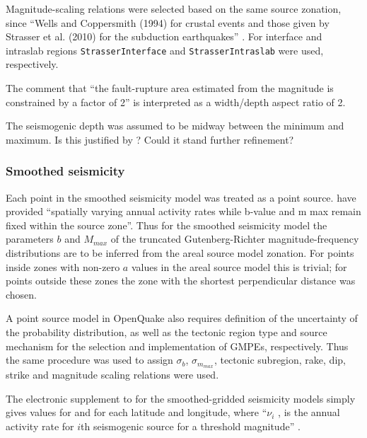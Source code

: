 \documentclass{article}
\begin{document}
Magnitude-scaling relations were selected based on the same source zonation, since ``Wells and Coppersmith (1994) for crustal events and those given by
Strasser et al. (2010) for the subduction earthquakes'' \citep[p.~140]{nath2012probabilistic}. For interface and intraslab regions \texttt{StrasserInterface} and \texttt{StrasserIntraslab} were used, respectively. 

The comment that ``the fault-rupture area estimated from the magnitude is constrained by a factor of 2'' \citep[p.~140]{nath2012probabilistic} is interpreted as a width/depth aspect ratio of 2.

The seismogenic depth was assumed to be midway between the minimum and maximum. Is this justified by \cite{thingbaijam2011seismogenic}? Could it stand further refinement?


\subsubsection{Smoothed seismicity}
\label{sec:Smoothed}

Each point in the smoothed seismicity model was treated as a point source. \cite{nath2012probabilistic} have provided ``spatially varying annual activity rates while b-value and m max remain fixed within the source zone''. Thus for the smoothed seismicity model the parameters $b$ and $M_{max}$ of the truncated Gutenberg-Richter magnitude-frequency distributions are to be inferred from the areal source model zonation. For points inside zones with non-zero $a$ values in the areal source model this is trivial; for points outside these zones the zone with the shortest perpendicular distance was chosen.

A point source model in OpenQuake also requires definition of the uncertainty of the probability distribution, as well as the tectonic region type and source mechanism for the selection and implementation of GMPEs, respectively. Thus the same procedure was used to assign $\sigma_b$, $\sigma_{m_{max}}$, tectonic subregion, rake, dip, strike and magnitude scaling relations were used.

The electronic supplement to \cite{nath2012probabilistic} for the smoothed-gridded seismicity models simply gives values for \texttt{} and \texttt{} for each latitude and longitude, where ``$\nu_i$ , is the annual activity rate for $i$th seismogenic source for a threshold magnitude'' \cite[p.~140]{nath2012probabilistic}.
\end{document}
